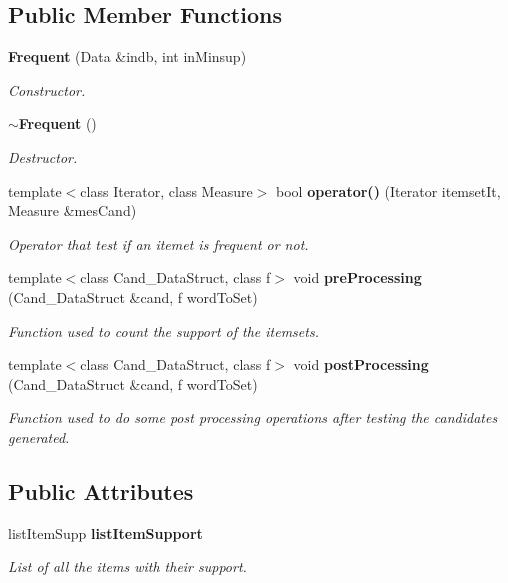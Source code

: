 \subsection*{Public Member Functions}
\begin{CompactItemize}
\item 
{\bf Frequent} (Data \&indb, int in\-Minsup)
\begin{CompactList}\small\item\em Constructor. \item\end{CompactList}\item 
{\bf $\sim$Frequent} ()\label{class_frequent_c3612977fa17e8dfda09132b36a42d7f}

\begin{CompactList}\small\item\em Destructor. \item\end{CompactList}\item 
template$<$class Iterator, class Measure$>$ bool {\bf operator()} (Iterator itemset\-It, Measure \&mes\-Cand)
\begin{CompactList}\small\item\em Operator that test if an itemet is frequent or not. \item\end{CompactList}\item 
template$<$class Cand\_\-Data\-Struct, class f$>$ void {\bf pre\-Processing} (Cand\_\-Data\-Struct \&cand, f word\-To\-Set)
\begin{CompactList}\small\item\em Function used to count the support of the itemsets. \item\end{CompactList}\item 
template$<$class Cand\_\-Data\-Struct, class f$>$ void {\bf post\-Processing} (Cand\_\-Data\-Struct \&cand, f word\-To\-Set)
\begin{CompactList}\small\item\em Function used to do some post processing operations after testing the candidates generated. \item\end{CompactList}\end{CompactItemize}
\subsection*{Public Attributes}
\begin{CompactItemize}
\item 
list\-Item\-Supp {\bf list\-Item\-Support}
\begin{CompactList}\small\item\em List of all the items with their support. \item\end{CompactList}\end{CompactItemize}
